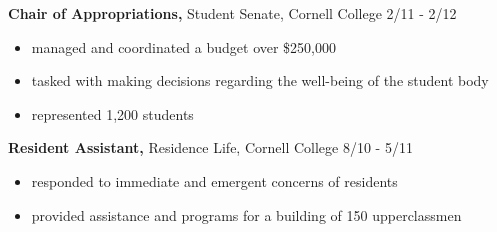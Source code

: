 \documentclass[margin]{res}
\begin{document}
\begin{resume}
{\bf Chair of Appropriations,} Student Senate, Cornell College \hfill 2/11 - 2/12
\begin{itemize} \itemsep -2pt %
  \item managed and coordinated a budget over \$250,000
  \item tasked with making decisions regarding the well-being of the student body
  \item represented 1,200 students
\end{itemize}

{\bf Resident Assistant,} Residence Life, Cornell College \hfill 8/10 - 5/11
\begin{itemize} \itemsep -2pt  %
  \item responded to immediate and emergent concerns of residents
  \item provided assistance and programs for a building of 150 upperclassmen
\end{itemize}





\end{resume}
\end{document}

